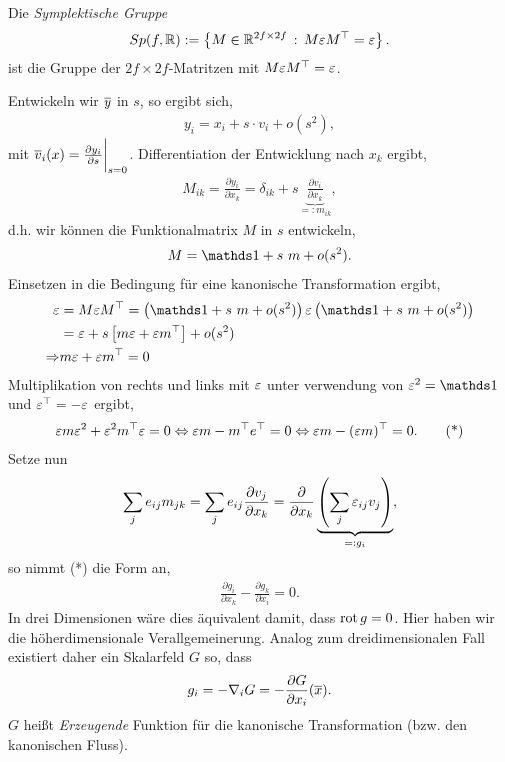 \begin{defnn}
Die \emph{Symplektische Gruppe}
\begin{align*}
Sp(f,\mathbb{R}) := \left\{ M \in \mathbb{R}^{2f\times 2f}\,:\,M\varepsilon M^\top =\varepsilon\right\}.
\end{align*}
ist die Gruppe der $2f\times 2f$-Matritzen mit $M\varepsilon M^\top = \varepsilon$.\fishhere
\end{defnn}

Entwickeln wir $\overline{y}$ in $s$, so ergibt sich,
\begin{align*}
y_i = x_i + s\cdot v_i + o(s^2),
\end{align*}
mit $\overline{v}_i(x) = \frac{\partial y_i}{\partial s}\bigg|_{s=0}$.
Differentiation der Entwicklung nach $x_k$ ergibt,
\begin{align*}
M_{ik}  = \frac{\partial y_i}{\partial x_k} = \delta_{ik} + s
\underbrace{\frac{\partial v_i}{\partial x_k}}_{=:m_{ik}},
\end{align*}
d.h. wir können die Funktionalmatrix $M$ in $s$ entwickeln,
\begin{align*}
M = \Id + s\ m + o(s^2).
\end{align*}
Einsetzen in die Bedingung für eine kanonische Transformation ergibt,
\begin{align*}
\ep &= M\ep M^\top = \left(\Id + s\ m + o(s^2)\right)\ep\left(\Id + s\ m +
o(s^2) \right) \\ &= \ep + s\left[m\ep + \ep m^\top \right] + o(s^2)\\
\Rightarrow & m\ep + \ep m^\top = 0
\end{align*}
Multiplikation von rechts und links mit $\varepsilon$ unter verwendung von $\ep^2 =\Id$
und $\varepsilon^\top = -\varepsilon$ ergibt,
\begin{align*}
\varepsilon m \varepsilon^2 + \varepsilon^2 m^\top\varepsilon = 0
\Leftrightarrow
\varepsilon m -m^\top e^\top  = 0
\Leftrightarrow
\varepsilon m - (\varepsilon m)^\top = 0.\tag{*}
\end{align*}
Setze nun
\begin{align*}
\sum_j e_{ij} m_{jk} = \sum_j e_{ij}\frac{\partial v_j}{\partial x_k}
= \frac{\partial}{\partial x_k}\underbrace{\left(\sum_j \varepsilon_{ij}v_j
\right)}_{=:g_i},
\end{align*}
so nimmt (*) die Form an,
\begin{align*}
\frac{\partial g_i}{\partial x_k} - \frac{\partial g_k}{\partial x_i} = 0.
\end{align*}
In drei Dimensionen wäre dies äquivalent damit, dass $\operatorname{rot} g = 0$. Hier haben
wir die höherdimensionale Verallgemeinerung. Analog zum dreidimensionalen Fall
existiert daher ein Skalarfeld $G$ so, dass
\begin{align*}
g_i = -\nabla_i G = - \frac{\partial G}{\partial x_i}(\overline{x}). 
\end{align*}
$G$ heißt \emph{Erzeugende} Funktion für die kanonische Transformation (bzw. den
kanonischen Fluss).

